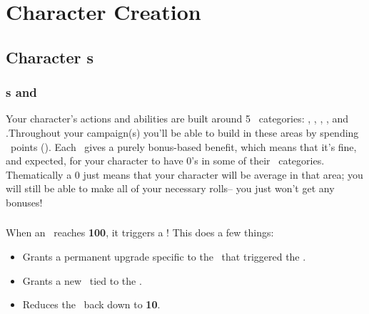 \part{Character Creation}
\chapter{Character \attribute s}

\section{\attribute s and \attrval}
Your character's actions and abilities are built around 5 \attribute\ 
categories: \POWEful, \KNOWful, \ENDUful, \SPEDful, and \FOREful.Throughout
your campaign(s) you'll be able to build in these areas by spending
\attribute\ points (\attrval). Each \attribute\  gives a purely
bonus-based benefit, which means that it's fine, and expected, for
your character to have 0's in some of their \attribute\  categories.
Thematically a 0 just means that your character will be average in that
area; you will still be able to make all of your necessary rolls--
you just won't get any bonuses! 


\section{\BURST{}}

When an \attribute\  reaches \textbf{100}, it triggers a \BURST !
This does a few things:
\begin{itemize}
\item Grants a permanent upgrade specific to the \attribute\ that triggered the \BURST.
\item Grants a new \techn\  tied to the \attribute.
\item Reduces the \attribute\  back down to \textbf{10}.
\end{itemize}

